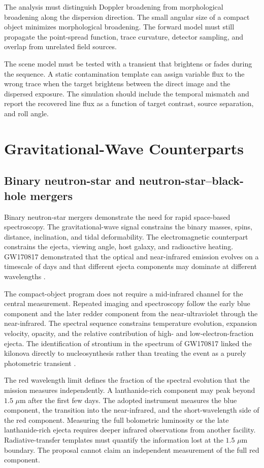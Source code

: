 \documentclass[10pt,onecolumn]{article}
\newcommand{\micron}{\,\mu\mathrm{m}}
\begin{document}
The analysis must distinguish Doppler broadening from morphological broadening
along the dispersion direction. The small angular size of a compact object
minimizes morphological broadening. The forward model must still propagate the
point-spread function, trace curvature, detector sampling, and overlap from
unrelated field sources.

The scene model must be tested with a transient that brightens or fades during
the sequence. A static contamination template can assign variable flux to the
wrong trace when the target brightens between the direct image and the
dispersed exposure. The simulation should include the temporal mismatch and
report the recovered line flux as a function of target contrast, source
separation, and roll angle.

\section{Gravitational-Wave Counterparts}

\subsection{Binary neutron-star and neutron-star--black-hole mergers}

Binary neutron-star mergers demonstrate the need for rapid space-based
spectroscopy. The gravitational-wave signal
constrains the binary masses, spins, distance, inclination, and tidal
deformability. The electromagnetic counterpart constrains the ejecta, viewing
angle, host galaxy, and radioactive heating. GW170817
demonstrated that the optical and near-infrared emission evolves on a
timescale of days and that different ejecta components may dominate at
different wavelengths \cite{abbott2017,arcavi2017,tanaka2017}.

The compact-object program does not require a mid-infrared channel for the
central measurement. Repeated imaging and spectroscopy follow the early blue
component and the later redder component from the near-ultraviolet through the
near-infrared. The spectral sequence constrains
temperature evolution, expansion velocity, opacity, and the relative
contribution of high- and low-electron-fraction ejecta. The identification of
strontium in the spectrum of GW170817 linked the kilonova directly to
nucleosynthesis rather than treating the event as a purely
photometric transient \cite{watson2019}.

The red wavelength limit defines the fraction of the spectral evolution that
the mission measures independently. A lanthanide-rich component may peak
beyond $1.5\,\micron$ after the first few days. The adopted instrument measures
the blue component, the transition into the near-infrared, and the
short-wavelength side of the red component. Measuring the full bolometric
luminosity or the late lanthanide-rich ejecta requires deeper infrared
observations from another facility. Radiative-transfer templates must quantify
the information lost at the $1.5\,\micron$ boundary. The proposal cannot claim
an independent measurement of the full red component.
\end{document}
